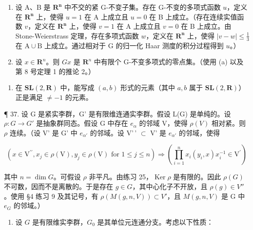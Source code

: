 \begin{enumerate}
\def\labelenumi{(\alph{enumi})}
\item
  设 A、B 是 \(\mathbf{R}^{\mathbf{n}}\) 中不交的紧 G-不变子集。存在 G-不变的多项式函数 \(u\)，定义在 \(\mathbf{R}^{\mathbf{n}}\) 上，使得 \(u = 1\) 在 \(\mathrm{A}\) 上成立且 \(u = 0\) 在 B 上成立。（存在连续实值函数 \(v\)，定义在 \(\mathbf{R}^{\mathbf{n}}\) 上，使得 \(v = 1\) 在 A 上成立且 \(v = 0\) 在 B 上成立。由 Stone-Weierstrass 定理，存在多项式函数 \(w\)，定义在 \(\mathbf{R}^{\mathbf{n}}\) 上，使得 \(|v - w| \leqslant \frac{1}{3}\) 在 \(\mathrm{A} \cup \mathrm{B}\) 上成立。通过相对于 G 的归一化 Haar 测度的积分过程得到 \(u\)。）
\item
  设 \(x \in \mathbf{R}^n\)。则 \(Gx\) 是 \(\mathbf{R}^n\) 中有限个 G-不变多项式的零点集。（使用 (a) 以及第 8 号定理 1 的推论 2。）
\end{enumerate}

\begin{enumerate}
\def\labelenumi{\arabic{enumi}.}
\setcounter{enumi}{35}
\tightlist
\item
  在 \(\mathbf{SL}(2, \mathbf{R})\) 中，能写成 \((a, b)\) 形式的元素（其中 \(a, b\) 属于 \(\mathbf{SL}(2, \mathbf{R})\)）正是满足 \(\neq -1\) 的元素。
\end{enumerate}

¶ 37. 设 G 是紧实李群，G' 是有限维连通实李群。假设 L(G) 是单纯的。设 \(\rho: G \to G'\) 是抽象群同态。假设 G 中存在 \(e_{\alpha}\) 的邻域 V，使得 \(\rho(V)\) 相对紧。则 \(\rho\) 连续。（设 V' 是 G' 中 \(e_{\alpha'}\) 的邻域。设 V'\,' \(\subset\) V' 是 \(e_{\alpha'}\) 的邻域，使得

\[
(x \in \mathrm{V} ^ {\prime \prime}, x _ {j} \in \rho (\mathrm{V}), y _ {j} \in \rho (\mathrm{V}) \text {   for   } 1 \leqslant j \leqslant n) \Rightarrow \left(\prod_ {i = 1} ^ {n} x _ {i} (y _ {i}, x) x _ {i} ^ {- 1} \in \mathrm{V} ^ {\prime}\right)
\]

其中 \(n = \dim G\)。可假设 \(\rho\) 非平凡。由练习 25，\(\operatorname{Ker} \rho\) 是有限的。因此 \(\rho(G)\) 不可数，因而不是离散的。于是存在 \(g \in G\)，其中心化子不开放，且 \(\rho(g) \in V''\)。使用 §4 练习 9 及其记号，有 \(\rho(M(g, n, V)) \subset V'\)，且 \(M(g, n, V)\) 是 G 中 \(e_G\) 的邻域。）

\begin{enumerate}
\def\labelenumi{\arabic{enumi}.}
\setcounter{enumi}{37}
\tightlist
\item
  设 \(G\) 是有限维实李群，\(G_0\) 是其单位元连通分支。考虑以下性质：
\end{enumerate}

